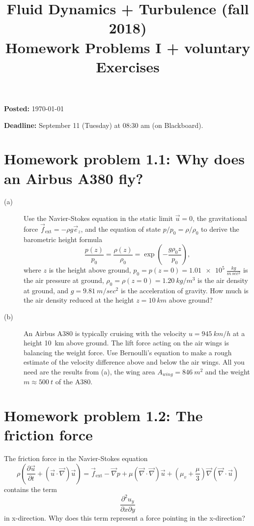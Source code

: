 \documentclass[a4paper, 10pt]{article}
\title{Fluid Dynamics + Turbulence (fall 2018)\\Homework Problems I + voluntary Exercises}
\author{}
\date{}
\newcommand{\pdiff}[2]{\frac{\partial #1}{\partial #2}} %
\begin{document}
\maketitle

\large{
\textbf{Posted:}
\today

\bigskip
\textbf{Deadline:}
September 11 (Tuesday) at 08:30 am (on Blackboard).
}

\bigskip

\section*{Homework problem 1.1: Why does an Airbus A380 fly?}
\begin{description}
\item[(a)]
Use the Navier-Stokes equation in the static limit $\vec{u}=0$, the gravitational force $\vec{f}_\mathrm{ext} = -\rho g \vec{e}_z$,  and the equation of state $p/p_0=\rho/\rho_0$ to derive the barometric height formula
\begin{equation*}
    \frac{p(z)}{p_0} = \frac{\rho(z)}{\rho_0} = \exp \left(-\frac{g\rho_0 z}{p_0}\right),
\end{equation*}
where $z$ is the height above ground, $p_0=p(z=0)=\SI{1.01e5}{\frac{kg}{m\, sec^2}}$ is the air pressure at ground, $\rho_0=\rho(z=0)=\SI{1.20}{kg/m^3}$ is the air density at ground, and $g=\SI{9.81}{m/sec^2}$ is the acceleration of gravity. How much is the air density reduced at the height $z=\SI{10}{km}$ above ground?

\item[(b)]
An Airbus A380 is typically cruising with the velocity $u=\SI{945}{km/h}$ at a height \SI{10}{km} above ground. The lift force acting on the air wings is balancing the weight force. Use Bernoulli's equation to make a rough estimate of the velocity difference above and below the air wings. All you need are the results from (a), the wing area $A_{wing} = \SI{846}{m^2}$ and the weight $m \approx \SI{500}{t}$ of the A380.
\end{description}

\section*{Homework problem 1.2: The friction force}
The friction force in the Navier-Stokes equation
\begin{equation}
    \rho \left(\pdiff{\vec{u}}{t} + \left(\vec{u}\cdot\vec{\nabla}\right)\vec{u}\right) =
    \vec{f}_{\mathrm{ext}} - \vec{\nabla}p + \mu \left(\vec{\nabla}\cdot\vec{\nabla}\right)\vec{u} +
    \left(\mu_v + \frac{\mu}{3}\right)\vec{\nabla}\left(\vec{\nabla}\cdot\vec{u}\right)
\end{equation}
contains the term
\begin{equation}
    \pdiff{^2u_y}{x\partial y}
\end{equation}
in x-direction. Why does this term represent a force pointing in the x-direction?
\end{document}
